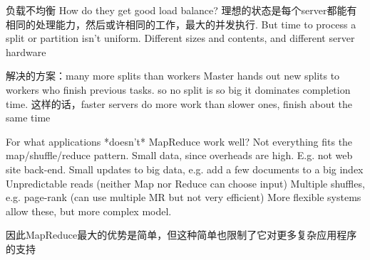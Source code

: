 负载不均衡
How do they get good load balance?
理想的状态是每个server都能有相同的处理能力，然后或许相同的工作，最大的并发执行.
But time to process a split or partition isn't uniform.
Different sizes and contents, and different server hardware

解决的方案：many more splits than workers
Master hands out new splits to workers who finish previous tasks.
so no split is so big it dominates completion time.
这样的话，faster servers do more work than slower ones, finish about the same time

For what applications *doesn't* MapReduce work well?
  Not everything fits the map/shuffle/reduce pattern.
  Small data, since overheads are high. E.g. not web site back-end.
  Small updates to big data, e.g. add a few documents to a big index
  Unpredictable reads (neither Map nor Reduce can choose input)
  Multiple shuffles, e.g. page-rank (can use multiple MR but not very efficient)
  More flexible systems allow these, but more complex model.

因此MapReduce最大的优势是简单，但这种简单也限制了它对更多复杂应用程序的支持





